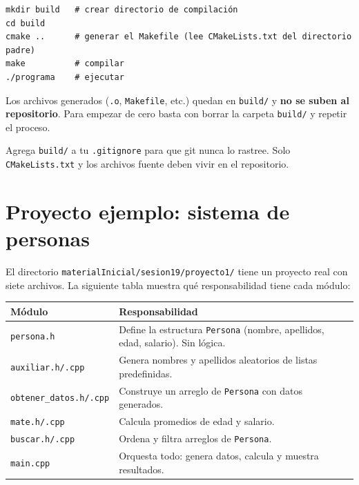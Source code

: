 \documentclass[12pt, oneside]{article}
\begin{document}
\begin{verbatim}
mkdir build   # crear directorio de compilación
cd build
cmake ..      # generar el Makefile (lee CMakeLists.txt del directorio padre)
make          # compilar
./programa    # ejecutar
\end{verbatim}

Los archivos generados (\texttt{.o}, \texttt{Makefile}, etc.) quedan en
\texttt{build/} y \textbf{no se suben al repositorio}.  Para empezar de
cero basta con borrar la carpeta \texttt{build/} y repetir el proceso.

\begin{consejo}
  Agrega \texttt{build/} a tu \texttt{.gitignore} para que git nunca
  lo rastree.  Solo \texttt{CMakeLists.txt} y los archivos fuente deben
  vivir en el repositorio.
\end{consejo}

\section{Proyecto ejemplo: sistema de personas}

El directorio \texttt{materialInicial/sesion19/proyecto1/} tiene un
proyecto real con siete archivos.  La siguiente tabla muestra qué
responsabilidad tiene cada módulo:

\begin{center}
\begin{tabular}{lp{9cm}}
  \toprule
  \textbf{Módulo} & \textbf{Responsabilidad} \\
  \midrule
  \texttt{persona.h}             & Define la estructura \texttt{Persona} (nombre, apellidos, edad, salario).  Sin lógica. \\
  \texttt{auxiliar.h/.cpp}       & Genera nombres y apellidos aleatorios de listas predefinidas. \\
  \texttt{obtener\_datos.h/.cpp} & Construye un arreglo de \texttt{Persona} con datos generados. \\
  \texttt{mate.h/.cpp}           & Calcula promedios de edad y salario. \\
  \texttt{buscar.h/.cpp}         & Ordena y filtra arreglos de \texttt{Persona}. \\
  \texttt{main.cpp}              & Orquesta todo: genera datos, calcula y muestra resultados. \\
  \bottomrule
\end{tabular}
\end{center}
\end{document}
